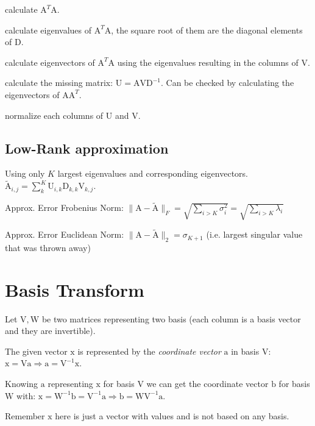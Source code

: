 \documentclass[a4paper, 11pt, landscape]{article}
\newcommand{\matr}[1]{\boldsymbol{\mathrm{#1}}}
\begin{document}
\begin{multicols*}{3}
\begin{compactenum}
	\item calculate $\matr{A}^T \matr{A}$.
	\item calculate eigenvalues of $\matr{A}^T \matr{A}$, the square root of them are the diagonal elements of $\matr{D}$.
	\item calculate eigenvectors of $\matr{A}^T \matr{A}$ using the eigenvalues resulting in the columns of $\matr{V}$.
	\item calculate the missing matrix: $\matr{U} = \matr{A} \matr{V} \matr{D}^{-1}$. Can be checked by calculating the eigenvectors of $\matr{A} \matr{A}^T$.
	\item normalize each columns of $\matr{U}$ and $\matr{V}$.
\end{compactenum}

\subsection{Low-Rank approximation}
Using only $K$ largest eigenvalues and corresponding eigenvectors. $\tilde{\matr{A}}_{i, j} = \sum_{k}^K \matr{U}_{i, k} \matr{D}_{k,k} \matr{V}_{k, j}$.
\begin{compactdesc}
	\item[Approx. Error Frobenius Norm:] $\|\matr{A} - \tilde{\matr{A}}\|_F = \sqrt{\sum_{i > K} \sigma_i^2} = \sqrt{\sum_{i > K} \lambda_i}$
	\item[Approx. Error Euclidean Norm:] $\|\matr{A} - \tilde{\matr{A}}\|_2 = \sigma_{K+1}$ (i.e. largest singular value that was thrown away)
\end{compactdesc}

\section{Basis Transform}
Let $\matr{V}, \matr{W}$ be two matrices representing two basis (each column is a basis vector and they are invertible).

The given vector $\matr{x}$ is represented by the \emph{coordinate vector} $\matr{a}$ in basis $\matr{V}$: $\matr{x} = \matr{V} \matr{a} \Rightarrow \matr{a} = \matr{V}^{-1} \matr{x}$.

Knowing $\matr{a}$ representing $\matr{x}$ for basis $\matr{V}$ we can get the coordinate vector $\matr{b}$ for basis $\matr{W}$ with: $\matr{x} = \matr{W}^{-1} \matr{b} = \matr{V}^{-1} \matr{a} \Rightarrow \matr{b} = \matr{W} \matr{V}^{-1} \matr{a}$.

Remember $\matr{x}$ here is just a vector with values and is not based on any basis.


\end{multicols*}
\end{document}
